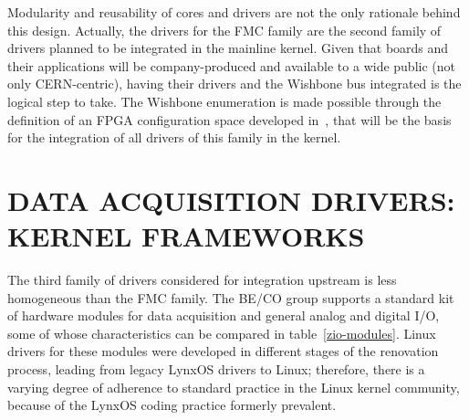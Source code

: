 \documentclass{JAC2003}
\begin{document}
Modularity and reusability of cores and drivers are not the only
rationale behind this design. Actually, the drivers for the FMC family
are the second family of drivers planned to be integrated in the
mainline kernel. Given that boards and their applications will be
company-produced and available to a wide public (not only CERN-centric),
having their drivers and the Wishbone bus integrated is the logical step
to take. The Wishbone enumeration is made possible through the
definition of an FPGA configuration space developed
in~\cite{fpga-config-space}, that will be the basis for the integration of
all drivers of this family in the kernel.

\section{DATA ACQUISITION DRIVERS: KERNEL FRAMEWORKS}


The third family of drivers considered for integration upstream is less
homogeneous than the FMC family. The BE/CO group supports a standard kit
of hardware modules for data acquisition and general analog and digital
I/O, some of whose characteristics can be compared in
table~\ref{zio-modules}. Linux drivers for these modules were developed in
different stages of the renovation process, leading from legacy
LynxOS drivers to Linux; therefore, there is a varying degree of adherence to 
standard practice in the Linux kernel community, because of the
LynxOS coding practice formerly prevalent.
\end{document}

